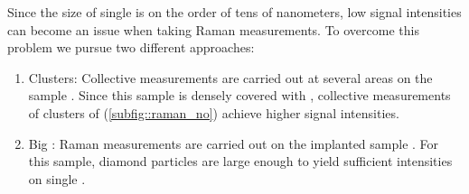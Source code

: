 			Since the size of single \nds is on the order of tens of nanometers, low signal intensities can become an issue when taking Raman measurements.
			To overcome this problem we pursue two different approaches:
			\begin{enumerate}[label=\alph*),ref=\alph*)]
				\item \Nd Clusters: \label{item::raman_gband} Collective measurements are carried out at several areas on the sample \insituS. Since this sample is densely covered with \nds, collective measurements of clusters of \nds (\cref{subfig::raman_no}) achieve higher signal intensities.
				\item Big \Nds: \label{item::raman_implanted} Raman measurements are carried out on the implanted sample \implantedTao. For this sample, diamond particles are large enough to yield sufficient intensities on single \nds.
			\end{enumerate}

